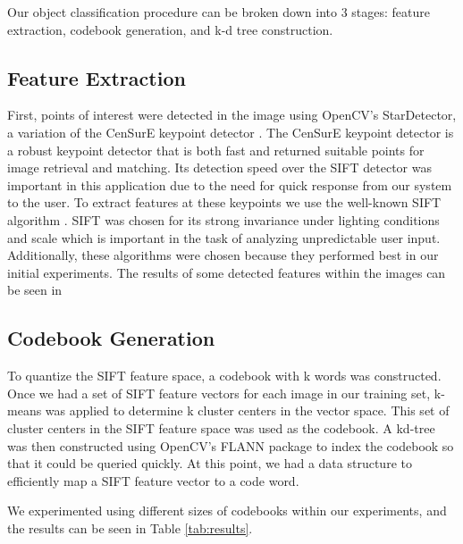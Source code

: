 Our object classification procedure can be broken down into 3 stages: feature
extraction, codebook generation, and k-d tree construction.

\subsection{Feature Extraction}
First, points of interest were detected in the image using OpenCV's StarDetector,
a variation of the CenSurE keypoint detector \cite{agrawal2008censure}. 
The CenSurE keypoint detector is a robust keypoint detector that is both fast and returned suitable points for image retrieval and matching.
Its detection speed over the SIFT detector was important in this application due to the need for quick response from our system to the user.
To extract features at these keypoints we use the well-known SIFT algorithm \cite{lowe1999object}. 
SIFT was chosen for its strong invariance under lighting conditions and scale which is important in the task of analyzing unpredictable user input. 
Additionally, these algorithms were chosen because they performed best in our initial experiments.
The results of some detected features within the images can be seen in 

\subsection{Codebook Generation}
To quantize the SIFT feature space, a codebook with k words was constructed.
Once we had a set of SIFT feature vectors for each image in our training set, k-means was applied to determine k cluster centers in the vector space. 
This set of cluster centers in the SIFT feature space was used as the codebook. 
A kd-tree was then constructed using OpenCV's FLANN \cite{muja2009fast} package to index the codebook so that it could be queried quickly. 
At this point, we had a data structure to efficiently map a SIFT feature vector to a code word.

We experimented using different sizes of codebooks within our experiments, and the results can be seen in Table \ref{tab:results}.

